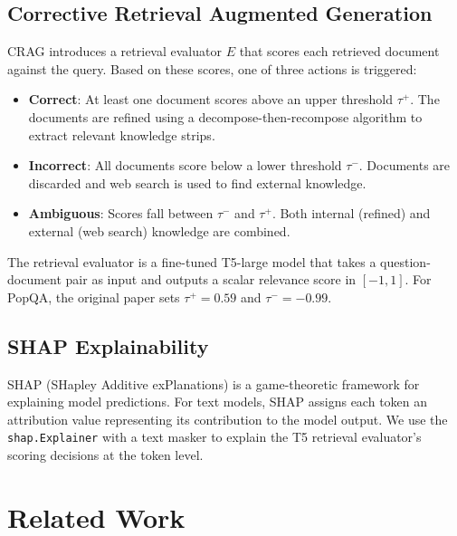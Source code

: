 \documentclass[11pt]{article}
\begin{document}
\subsection{Corrective Retrieval Augmented Generation}
CRAG \cite{yan2024corrective} introduces a retrieval evaluator $E$ that scores each retrieved
document against the query. Based on these scores, one of three actions is triggered:

\begin{itemize}
    \item \textbf{Correct}: At least one document scores above an upper threshold $\tau^+$. The
          documents are refined using a decompose-then-recompose algorithm to extract relevant
          knowledge strips.
    \item \textbf{Incorrect}: All documents score below a lower threshold $\tau^-$. Documents are
          discarded and web search is used to find external knowledge.
    \item \textbf{Ambiguous}: Scores fall between $\tau^-$ and $\tau^+$. Both internal (refined)
          and external (web search) knowledge are combined.
\end{itemize}

The retrieval evaluator is a fine-tuned T5-large model \cite{raffel2020exploring} that takes a
question-document pair as input and outputs a scalar relevance score in $[-1, 1]$. For PopQA, the
original paper sets $\tau^+ = 0.59$ and $\tau^- = -0.99$.

\subsection{SHAP Explainability}
SHAP (SHapley Additive exPlanations) \cite{lundberg2017unified} is a game-theoretic framework for
explaining model predictions. For text models, SHAP assigns each token an attribution value
representing its contribution to the model output. We use the \texttt{shap.Explainer} with a text
masker to explain the T5 retrieval evaluator's scoring decisions at the token level.

\section{Related Work}
\end{document}
